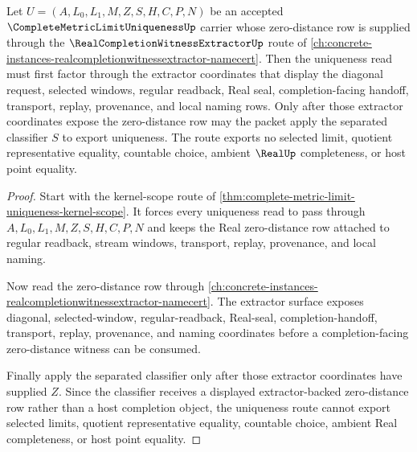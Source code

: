\begin{theorem}
\label{thm:complete-metric-limit-uniqueness-real-completion-witness-route}
Let $U=(A,L_{0},L_{1},M,Z,S,H,C,P,N)$ be an accepted $\CompleteMetricLimitUniquenessUp$ carrier whose zero-distance row is supplied through the $\RealCompletionWitnessExtractorUp$ route of \autoref{ch:concrete-instances-realcompletionwitnessextractor-namecert}. Then the uniqueness read must first factor through the extractor coordinates that display the diagonal request, selected windows, regular readback, Real seal, completion-facing handoff, transport, replay, provenance, and local naming rows. Only after those extractor coordinates expose the zero-distance row may the packet apply the separated classifier $S$ to export uniqueness. The route exports no selected limit, quotient representative equality, countable choice, ambient $\RealUp$ completeness, or host point equality.
\end{theorem}
\begin{proof}
Start with the kernel-scope route of \autoref{thm:complete-metric-limit-uniqueness-kernel-scope}. It forces every uniqueness read to pass through $A,L_{0},L_{1},M,Z,S,H,C,P,N$ and keeps the Real zero-distance row attached to regular readback, stream windows, transport, replay, provenance, and local naming.

Now read the zero-distance row through \autoref{ch:concrete-instances-realcompletionwitnessextractor-namecert}. The extractor surface exposes diagonal, selected-window, regular-readback, Real-seal, completion-handoff, transport, replay, provenance, and naming coordinates before a completion-facing zero-distance witness can be consumed.

Finally apply the separated classifier only after those extractor coordinates have supplied $Z$. Since the classifier receives a displayed extractor-backed zero-distance row rather than a host completion object, the uniqueness route cannot export selected limits, quotient representative equality, countable choice, ambient Real completeness, or host point equality.
\end{proof}

